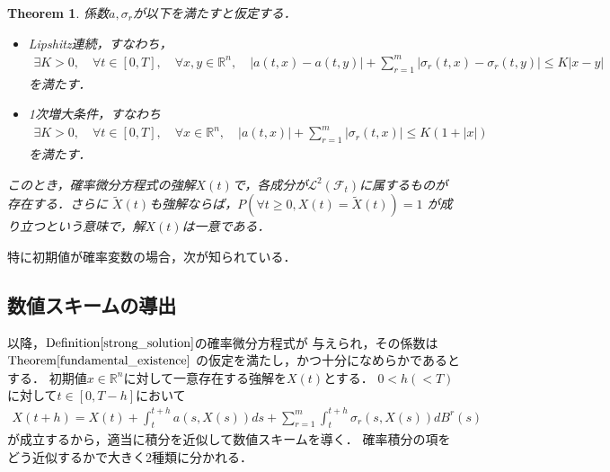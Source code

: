 \documentclass[dvipdfmx,autodetect-engine]{jsarticle}
\newtheorem{theorem}{Theorem}[section]
\theoremstyle{remark}
\theoremstyle{definition}
\newcommand{\R}{\mathbb{R}}
\newcommand{\abs}[1]{\left\lvert#1\right\rvert}
\begin{document}
\begin{theorem}\label{fundamental_existence}
    係数$a,\sigma_{r}$が以下を満たすと仮定する．
    \begin{itemize}
        \item Lipshitz連続，すなわち，
        \begin{align}
            \exists K>0,\quad \forall t \in [0,T],\quad \forall x,y \in \R^{n},\quad
            \abs{a(t,x)-a(t,y)} + \sum_{r=1}^{m} \abs{\sigma_{r}(t,x) - \sigma_{r}(t,y)} 
            \leq K\abs{x-y}
        \end{align}
        を満たす．
        \item 1次増大条件，すなわち
        \begin{align}
            \exists K>0,\quad \forall t \in [0,T],\quad \forall x\in \R^{n},\quad
            \abs{a(t,x)} + \sum_{r=1}^{m} \abs{\sigma_{r}(t,x)} \leq K(1+\abs{x})
        \end{align}
        を満たす．
    \end{itemize}
    このとき，確率微分方程式の強解$X(t)$で，各成分が$\mathcal{L}^2 (\mathcal{F}_{t})$に属するものが
    存在する．さらに
    $\tilde{X}(t)$も強解ならば，$P(\forall t \geq 0,X(t)=\tilde{X}(t))=1$
    が成り立つという意味で，解$X(t)$は一意である．
\end{theorem}

特に初期値が確率変数の場合，次が知られている．


\subsection{数値スキームの導出}
以降，$\mathrm{Definition}\ref{strong_solution}$の確率微分方程式が
与えられ，その係数は$\mathrm{Theorem}\ref{fundamental_existence}$
の仮定を満たし，かつ十分になめらかであるとする．
初期値$x \in \R^n$に対して一意存在する強解を$X(t)$とする．
$0<h(<T)$に対して$t \in [0,T-h]$において
\begin{align}
    X(t+h) = X(t) + \int_{t}^{t+h} a(s,X(s))ds + 
    \sum_{r=1}^{m} \int_{t}^{t+h} \sigma_{r}(s,X(s))dB^{r}(s)
\end{align}
が成立するから，適当に積分を近似して数値スキームを導く．
確率積分の項をどう近似するかで大きく2種類に分かれる．
\end{document}
